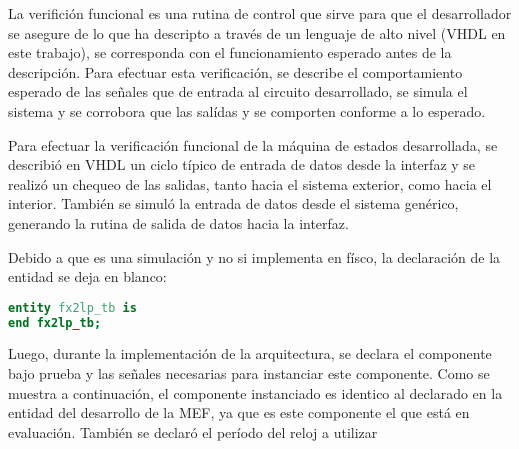 La verifición funcional es una rutina de control que sirve para que el desarrollador se asegure de lo que ha descripto a través de un lenguaje de alto nivel (VHDL en este trabajo), se corresponda con el funcionamiento esperado antes de la descripción. Para efectuar esta verificación, se describe el comportamiento esperado de las señales que de entrada al circuito desarrollado, se simula el sistema y se corrobora que las salídas y se comporten conforme a lo esperado.

Para efectuar la verificación funcional de la máquina de estados desarrollada, se describió en VHDL un ciclo típico de entrada de datos desde la interfaz y se realizó un chequeo de las salidas, tanto hacia el sistema exterior, como hacia el interior. También se simuló la entrada de datos desde el sistema genérico, generando la rutina de salida de datos hacia la interfaz.

Debido a que es una simulación y no si implementa en físco, la declaración de la entidad se deja en blanco:

\begin{lstlisting}[language=VHDL,backgroundcolor=\color{gray!30}]
entity fx2lp_tb is
end fx2lp_tb;
\end{lstlisting}

Luego, durante la implementación de la arquitectura, se declara el componente bajo prueba y las señales necesarias para instanciar este componente. Como se muestra a continuación, el componente instanciado es identico al declarado en la entidad del desarrollo de la MEF, ya que es este componente el que está en evaluación. También se declaró el período del reloj a utilizar

